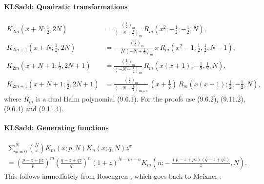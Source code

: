 \documentclass[envcountchap,graybox]{svmono}
\newcounter{rom}
\newcommand\thalf{\tfrac12}
\begin{document}
\paragraph{\large\bf KLSadd: Quadratic transformations}\begin{align}
K_{2m}(x+N;\thalf,2N)&=\frac{(\thalf)_m}{(-N+\thalf)_m}\,
R_m(x^2;-\thalf,-\thalf,N),
\label{31}\\
K_{2m+1}(x+N;\thalf,2N)&=-\,\frac{(\tfrac32)_m}{N\,(-N+\thalf)_m}\,
x\,R_m(x^2-1;\thalf,\thalf,N-1),
\label{33}\\
K_{2m}(x+N+1;\thalf,2N+1)&=\frac{(\tfrac12)_m}{(-N-\thalf)_m}\,
R_m(x(x+1);-\thalf,\thalf,N),
\label{32}\\
K_{2m+1}(x+N+1;\thalf,2N+1)&=\frac{(\tfrac32)_m}{(-N-\thalf)_{m+1}}\,
(x+\thalf)\,R_m(x(x+1);\thalf,-\thalf,N),
\label{34}
\end{align}
where $R_m$ is a dual Hahn polynomial (9.6.1). For the proofs use
(9.6.2), (9.11.2), (9.6.4) and (9.11.4).
%
\paragraph{\large\bf KLSadd: Generating functions}\begin{multline}
\sum_{x=0}^N\binom Nx K_m(x;p,N)K_n(x;q,N)z^x\\
=\left(\frac{p-z+pz}p\right)^m
\left(\frac{q-z+qz}q\right)^n
(1+z)^{N-m-n}
K_m\left(n;-\,\frac{(p-z+pz)(q-z+qz)}z,N\right).
\label{107}
\end{multline}
This follows immediately from Rosengren \cite[(3.5)]{K8}, which goes back
to Meixner \cite{K9}.
%
\end{document}
